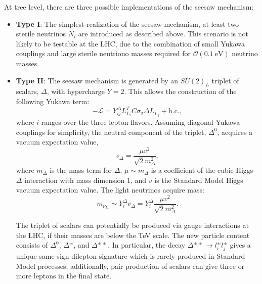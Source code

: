 At tree level, there are three possible implementations of the seesaw mechanism: 
\begin{itemize}
	\item \textbf{Type I}: The simplest realization of the seesaw mechanism, at least two sterile neutrinos $N_i$ are introduced as described above. This scenario is not likely to be testable at the LHC, due to the combination of small Yukawa couplings and large sterile neutriono masses required for $\mathcal{O}(0.1~\mbox{eV})$ neutrino masses. 

	\item \textbf{Type II}: The seesaw mechanism is generated by an $SU(2)_L$ triplet of scalars, $\Delta$, with hypercharge $Y=2$. This allows the construction of the following Yukawa term:
	\begin{equation}
		-\mathcal{L} = Y^{\Delta}_{ij} L_{L_i}^T C \sigma_2 \Delta L_{L_j} + \mathrm{h.c.},
	\end{equation}
	where $i$ ranges over the three lepton flavors.  Assuming diagonal Yukawa couplings for simplicity, the neutral component of the triplet, $\Delta^0$, acquires a vacuum expectation value,
	\begin{equation}
		v_{\Delta} = \frac{\mu v^2}{\sqrt{2} m_{\Delta}^2},
	\end{equation}
	where $m_{\Delta}$ is the mass term for $\Delta$, $\mu\sim m_{\Delta}$ is a coefficient of the cubic Higgs-$\Delta$ interaction with mass dimension 1, and $v$ is the Standard Model Higgs vacuum expectation value. The light neutrinos acquire mass:
	\begin{equation}
		m_{\nu_{L_i}} \sim Y^{\Delta}_{i} v_{\Delta}=Y^{\Delta}_{i} \frac{\mu v^2}{\sqrt{2} m_{\Delta}^2}.
	\end{equation}

	The triplet of scalars can potentially be produced via gauge interactions at the LHC, if their masses are below the TeV scale. The new particle content consists of $\Delta^0$, $\Delta^{\pm}$, and $\Delta^{\pm\pm}$. In particular, the decay $\Delta^{\pm\pm}\rightarrow l^{\pm}_i l^{\pm}_j$ gives a unique same-sign dilepton signature which is rarely produced in Standard Model processes; additionally, pair production of scalars can give three or more leptons in the final state.


\end{itemize}
